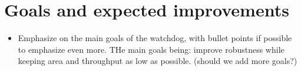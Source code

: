 \section{Goals and expected improvements}
\begin{itemize}
  \item Emphasize on the main goals of the watchdog, with bullet points if possible to emphasize even more. THe main goals being: improve robustness while keeping area and throughput as low as possible. (should we add more goals?)
\end{itemize}


